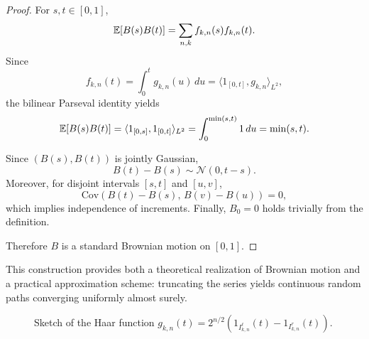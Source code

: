 \begin{proof}
For $s,t\in[0,1]$,
\[
\mathbb{E}[B(s)B(t)]
=
\sum_{n,k} f_{k,n}(s)f_{k,n}(t).
\]
Since
\[
f_{k,n}(t)=\int_0^t g_{k,n}(u)\,du
= \langle 1_{[0,t]}, g_{k,n}\rangle_{L^2},
\]
the bilinear Parseval identity yields
\[
\mathbb{E}[B(s)B(t)]
=
\langle 1_{[0,s]},1_{[0,t]}\rangle_{L^2}
=
\int_0^{\min(s,t)}1\,du
=
\min(s,t).
\]


Since $(B(s),B(t))$ is jointly Gaussian,
\[
B(t)-B(s)\sim\mathcal N(0,t-s).
\]
Moreover, for disjoint intervals $[s,t]$ and $[u,v]$,
\[
\mathrm{Cov}(B(t)-B(s),\,B(v)-B(u))=0,
\]
which implies independence of increments.
Finally, $B_0=0$ holds trivially from the definition.

Therefore $B$ is a standard Brownian motion on $[0,1]$.

\end{proof}

\begin{remark}
This construction provides both a theoretical realization of Brownian motion
and a practical approximation scheme: truncating the series yields continuous
random paths converging uniformly almost surely.
\end{remark}

\begin{figure}[h]
\centering
{}
\caption{Sketch of the Haar function $g_{k,n}(t)=2^{n/2}(1_{I^\ell_{k,n}}(t)-1_{I^r_{k,n}}(t))$.}
\end{figure}


